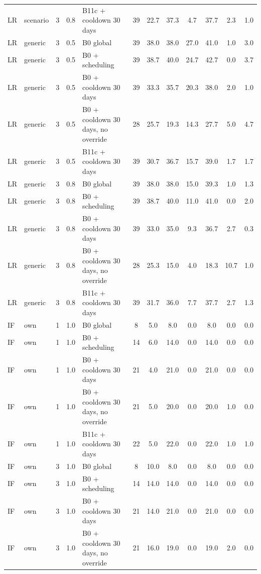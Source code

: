 \begin{longtable}{lllllccccccc}
LR & scenario & 3 & 0.8 & B11c + cooldown 30 days & 39 & 22.7 & 37.3 & 4.7 & 37.7 & 2.3 & 1.0 \\
LR & generic & 3 & 0.5 & B0 global & 39 & 38.0 & 38.0 & 27.0 & 41.0 & 1.0 & 3.0 \\
LR & generic & 3 & 0.5 & B0 + scheduling & 39 & 38.7 & 40.0 & 24.7 & 42.7 & 0.0 & 3.7 \\
LR & generic & 3 & 0.5 & B0 + cooldown 30 days & 39 & 33.3 & 35.7 & 20.3 & 38.0 & 2.0 & 1.0 \\
LR & generic & 3 & 0.5 & B0 + cooldown 30 days, no override & 28 & 25.7 & 19.3 & 14.3 & 27.7 & 5.0 & 4.7 \\
LR & generic & 3 & 0.5 & B11c + cooldown 30 days & 39 & 30.7 & 36.7 & 15.7 & 39.0 & 1.7 & 1.7 \\
LR & generic & 3 & 0.8 & B0 global & 39 & 38.0 & 38.0 & 15.0 & 39.3 & 1.0 & 1.3 \\
LR & generic & 3 & 0.8 & B0 + scheduling & 39 & 38.7 & 40.0 & 11.0 & 41.0 & 0.0 & 2.0 \\
LR & generic & 3 & 0.8 & B0 + cooldown 30 days & 39 & 33.0 & 35.0 & 9.3 & 36.7 & 2.7 & 0.3 \\
LR & generic & 3 & 0.8 & B0 + cooldown 30 days, no override & 28 & 25.3 & 15.0 & 4.0 & 18.3 & 10.7 & 1.0 \\
LR & generic & 3 & 0.8 & B11c + cooldown 30 days & 39 & 31.7 & 36.0 & 7.7 & 37.7 & 2.7 & 1.3 \\
IF & own & 1 & 1.0 & B0 global & 8 & 5.0 & 8.0 & 0.0 & 8.0 & 0.0 & 0.0 \\
IF & own & 1 & 1.0 & B0 + scheduling & 14 & 6.0 & 14.0 & 0.0 & 14.0 & 0.0 & 0.0 \\
IF & own & 1 & 1.0 & B0 + cooldown 30 days & 21 & 4.0 & 21.0 & 0.0 & 21.0 & 0.0 & 0.0 \\
IF & own & 1 & 1.0 & B0 + cooldown 30 days, no override & 21 & 5.0 & 20.0 & 0.0 & 20.0 & 1.0 & 0.0 \\
IF & own & 1 & 1.0 & B11c + cooldown 30 days & 22 & 5.0 & 22.0 & 0.0 & 22.0 & 1.0 & 1.0 \\
IF & own & 3 & 1.0 & B0 global & 8 & 10.0 & 8.0 & 0.0 & 8.0 & 0.0 & 0.0 \\
IF & own & 3 & 1.0 & B0 + scheduling & 14 & 14.0 & 14.0 & 0.0 & 14.0 & 0.0 & 0.0 \\
IF & own & 3 & 1.0 & B0 + cooldown 30 days & 21 & 14.0 & 21.0 & 0.0 & 21.0 & 0.0 & 0.0 \\
IF & own & 3 & 1.0 & B0 + cooldown 30 days, no override & 21 & 16.0 & 19.0 & 0.0 & 19.0 & 2.0 & 0.0 \\

\end{longtable}
